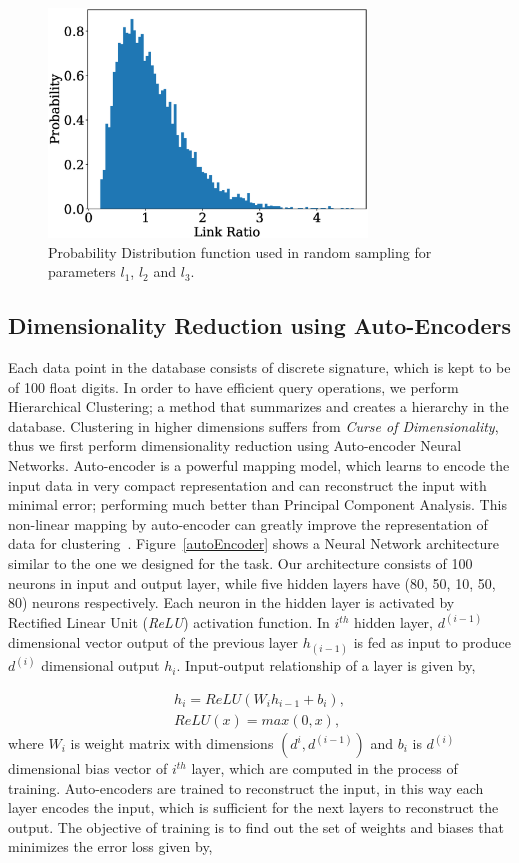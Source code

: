 \documentclass[twocolumn,10pt]{asme2e}
\begin{document}
\begin{figure}
\centering
\includegraphics[width=240pt]{figure/fig_logNormal.eps}
  \caption{Probability Distribution function used in random sampling for parameters $l_1$, $l_2$ and $l_3$.}
\label{logNormal}
\end{figure}

\subsection{Dimensionality Reduction using Auto-Encoders}
Each data point in the database consists of discrete signature, which is kept to be of 100 float digits.
In order to have efficient query operations, we perform Hierarchical Clustering; a method that summarizes and creates a hierarchy in the database.
Clustering in higher dimensions suffers from \emph{Curse of Dimensionality}\cite{marimont1979}, thus we first perform dimensionality reduction using Auto-encoder Neural Networks.
Auto-encoder is a powerful mapping model, which learns to encode the input data in very compact representation and can reconstruct the input with minimal error; performing much better than Principal Component Analysis\cite{hinton2006}.
This non-linear mapping by auto-encoder can greatly improve the representation of data for clustering~\cite{song2013}.
Figure~\ref{autoEncoder} shows a Neural Network architecture similar to the one we designed for the task.
Our architecture consists of 100 neurons in input and output layer, while five hidden layers have (80, 50, 10, 50, 80) neurons respectively.
Each neuron in the hidden layer is activated by Rectified Linear Unit (\emph{ReLU}) activation function.
In $i^{th}$ hidden layer, $d^{(i-1)}$ dimensional vector output of the previous layer $h_(i-1)$ is fed as input to produce $d^{(i)}$ dimensional output $h_i$.
Input-output relationship of a layer is given by,

\begin{eqnarray}\label{nnlayer}
  h_i = ReLU(W_{i}h_{i-1} + b_{i}), \\
  ReLU(x) = max(0, x),
\end{eqnarray}
where $W_i$ is weight matrix with dimensions $(d^{i}, d^{(i-1)})$ and $b_i$ is $d^{(i)}$ dimensional bias vector of $i^{th}$ layer, which are computed in the process of training.
Auto-encoders are trained to reconstruct the input, in this way each layer encodes the input, which is sufficient for the next layers to reconstruct the output.
The objective of training is to find out the set of weights and biases that minimizes the error loss given by,
\end{document}
